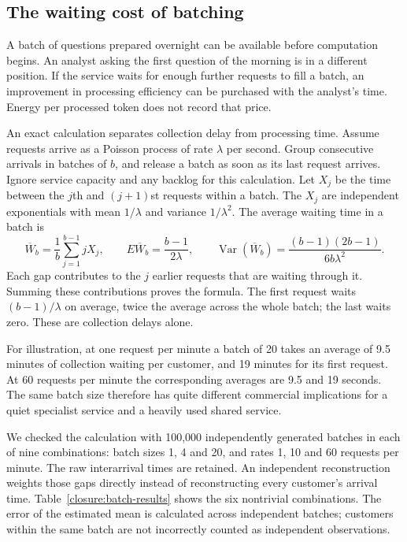 \subsection{The waiting cost of batching}

A batch of questions prepared overnight can be available before computation
begins. An analyst asking the first question of the morning is in a different
position. If the service waits for enough further requests to fill a batch,
an improvement in processing efficiency can be purchased with the analyst's
time. Energy per processed token does not record that price.

An exact calculation separates collection delay from processing time.
Assume requests arrive as a Poisson process of rate $\lambda$ per second.
Group consecutive arrivals in batches of $b$, and release a batch as soon as
its last request arrives. Ignore service capacity and any backlog for this
calculation. Let $X_j$ be the time between the $j$th and $(j+1)$st requests
within a batch. The $X_j$ are independent exponentials with mean
$1/\lambda$ and variance $1/\lambda^2$. The average waiting time in a batch
is
\begin{equation}
 \overline W_b=\frac1b\sum_{j=1}^{b-1}jX_j,
 \qquad
 E\overline W_b=\frac{b-1}{2\lambda},\qquad
 \operatorname{Var}(\overline W_b)=
 \frac{(b-1)(2b-1)}{6b\lambda^2}.
 \label{closure:batch-wait}
\end{equation}
Each gap contributes to the $j$ earlier requests that are waiting through
it. Summing these contributions proves the formula. The first request waits
$(b-1)/\lambda$ on average, twice the average across the whole batch;
the last waits zero. These are collection delays alone.

For illustration, at one request per minute a batch of 20 takes an average
of 9.5 minutes of collection waiting per customer, and 19 minutes for its
first request. At 60 requests per minute the corresponding averages are
9.5 and 19 seconds. The same batch size therefore has quite different
commercial implications for a quiet specialist service and a heavily used
shared service.

We checked the calculation with 100,000 independently generated batches in
each of nine combinations: batch sizes 1, 4 and 20, and rates 1, 10 and
60 requests per minute. The raw interarrival times are retained. An
independent reconstruction weights those gaps directly instead of
reconstructing every customer's arrival time. Table~\ref{closure:batch-results}
shows the six nontrivial combinations. The error of the estimated mean is
calculated across independent batches; customers within the same batch are
not incorrectly counted as independent observations.

